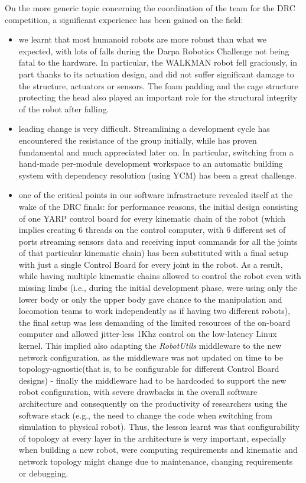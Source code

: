 \documentclass[%
	paper=A4,					%
	twoside=true,				%
	openright,			.
	parskip=full,				%
	chapterprefix=true,			%
	11pt,						%
	headings=normal,			%
	bibliography=totoc,			%
	listof=totoc,				%
	titlepage=on,				%
	captions=tableabove,		%
	draft=false,				%
]{scrreprt}%
\begin{document}
On the more generic topic concerning the coordination of the team for the DRC competition, a significant experience has been gained on the field:
\begin{itemize}
 \item we learnt that most humanoid robots are more robust than what we expected, with lots of falls during the Darpa Robotics Challenge not being fatal to the hardware. In particular, the WALKMAN robot fell graciously, in part thanks to its actuation design, and did not suffer significant damage to the structure, actuators or sensors. The foam padding and the cage structure protecting the head also played an important role for the structural integrity of the robot after falling.
 \item leading change is very difficult. Streamlining a development cycle has encountered the resistance of the group initially, while has proven fundamental and much appreciated later on. In particular, switching from a hand-made per-module development workspace to an automatic building system with dependency resolution (using YCM) has been a great challenge.
 \item one of the critical points in our software infrastracture revealed itself at the wake of the DRC finals: for performance reasons, the initial design consisting of one YARP control board for every kinematic chain of the robot (which implies creating 6 threads on the control computer, with 6 different set of ports streaming sensors data and receiving input commands for all the joints of that particular kinematic chain) has been substituted with a final setup with just a single Control Board for every joint in the robot. As a result, while having multiple kinematic chains allowed to control the robot even with missing limbs (i.e., during the initial development phase, were using only the lower body or only the upper body gave chance to the manipulation and locomotion teams to work independently as if having two different robots), the final setup was less demanding of the limited resources of the on-board computer and allowed jitter-less 1Khz control on the low-latency Linux kernel. This implied also adapting the \emph{RobotUtils} middleware to the new network configuration, as the middleware was not updated on time to be topology-agnostic(that is, to be configurable for different Control Board designs) - finally the middleware had to be hardcoded to support the new robot configuration, with severe drawbacks in the overall software architecture and consequently on the productivity of researchers using the software stack (e.g., the need to change the code when switching from simulation to physical robot). Thus, the lesson learnt was that configurability of topology at every layer in the architecture is very important, especially when building a new robot, were computing requirements and kinematic and network topology might change due to maintenance, changing requirements or debugging.
\end{itemize}
\end{document}
